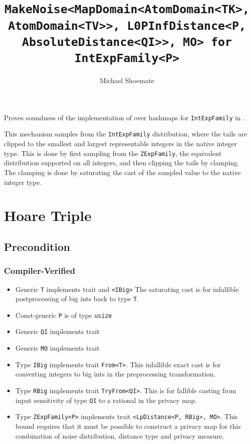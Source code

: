 \documentclass{article}
\title{\texttt{MakeNoise<MapDomain<AtomDomain<TK>, AtomDomain<TV>>, L0PInfDistance<P, AbsoluteDistance<QI>>, MO> for IntExpFamily<P>}}
\author{Michael Shoemate}
\date{}
\begin{document}
\maketitle

\contrib
Proves soundness of the implementation of  over hashmaps
for \texttt{IntExpFamily} in .

This mechanism samples from the \texttt{IntExpFamily} distribution, 
where the tails are clipped to the smallest and largest representable integers in the native integer type.
This is done by first sampling from the \texttt{ZExpFamily}, the equivalent distribution supported on all integers,
and then clipping the tails by clamping.
The clamping is done by saturating the cast of the sampled value to the native integer type.

\section{Hoare Triple}
\subsection*{Precondition}
\subsubsection*{Compiler-Verified}

\begin{itemize}
    \item Generic \texttt{T} implements trait  and \texttt{<IBig>}
        The saturating cast is for infallible postprocessing of big ints back to type \texttt{T}.
    \item Const-generic \texttt{P} is of type \texttt{usize}
    \item Generic \texttt{QI} implements trait 
    \item Generic \texttt{MO} implements trait 
    \item Type \texttt{IBig} implements trait \texttt{From<T>}.
        This infallible exact cast is for converting integers to big ints in the preprocessing transformation.
    \item Type \texttt{RBig} implements trait \texttt{TryFrom<QI>}.
        This is for fallible casting from input sensitivity of type \texttt{QI} to a rational in the privacy map.
    \item Type \texttt{ZExpFamily<P>} implements trait \texttt{<LpDistance<P, RBig>, MO>}.
        This bound requires that it must be possible to construct a privacy map for this combination of noise distribution, distance type and privacy measure.
\end{itemize}
\end{document}
